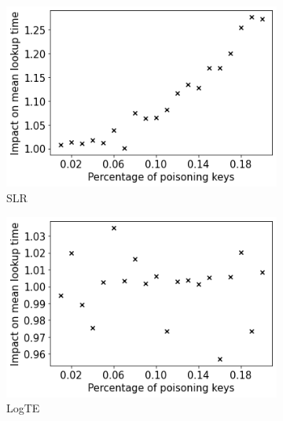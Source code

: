 \documentclass[sigconf]{acmart}
\begin{document}
\begin{figure}[h]
    \centering
    \begin{subfigure}[b]{0.24\textwidth}
        \centering
        \includegraphics[width=\textwidth]{figures/learned_indexes-mean_lookup_time-deterioration_slr.png}
        \caption{SLR}
    \end{subfigure}
    \hfill
    \begin{subfigure}[b]{0.24\textwidth}
        \centering
        \includegraphics[width=\textwidth]{figures/learned_indexes-mean_lookup_time-deterioration_logte.png}
        \caption{LogTE}
    \end{subfigure}
    \hfill
    \begin{subfigure}[b]{0.24\textwidth}
        \centering

\end{subfigure}
\end{figure}
\end{document}
